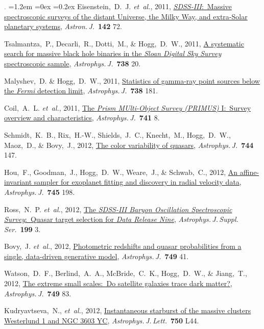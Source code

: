 \documentclass[10pt,letterpaper]{article}
\newcommand{\acronym}[1]{{\small{#1}}}
\newcommand{\foreign}[1]{\textsl{#1}}
\newcommand{\etal}{\foreign{et~al.}}
\newcommand{\project}[1]{\textsl{#1}}
\newcommand{\doi}[2]{\href{http://dx.doi.org/#1}{{#2}}}
\newcommand{\deemph}[1]{\textcolor{grey}{\footnotesize{#1}}}
\newcommand{\pubnumber}[1]{\deemph{{#1}.}}
\newcounter{refpubnum}
\newcommand{\hogglist}{%
    \rightmargin=0in
    \leftmargin=1.2em
    \topsep=0ex
    \partopsep=0pt
    \itemsep=0.2ex
    \parsep=0pt
    \itemindent=-1.0\leftmargin
    \listparindent=0.0\leftmargin
    \settowidth{\labelsep}{~}
    \usecounter{refpubnum}
  }
\begin{document}
\begin{list}{\pubnumber{\therefpubnum}}{\hogglist}
Eisenstein,~D.~J. \etal, 2011,
\doi{10.1088/0004-6256/142/3/72}{\project{\acronym{SDSS-III}}:\ Massive spectroscopic surveys of the distant Universe, the Milky Way, and extra-Solar planetary systems},
\textit{Astron.\,J.}\ \textbf{142} 72.
\item
Tsalmantza,~P., Decarli,~R., Dotti,~M., \& Hogg,~D.~W., 2011,
\doi{10.1088/0004-637X/738/1/20}{A systematic search for massive black hole binaries in the \project{Sloan Digital Sky Survey} spectroscopic sample},
\textit{Astrophys.\,J.}\ \textbf{738} 20.
\item
Malyshev,~D. \& Hogg,~D.~W., 2011,
\doi{10.1088/0004-637X/738/2/181}{Statistics of gamma-ray point sources below the \project{Fermi} detection limit},
\textit{Astrophys.\,J.}\ \textbf{738} 181.
\item
Coil,~A.~L. \etal, 2011,
\doi{10.1088/0004-637X/741/1/8}{The \project{Prism MUlti-Object Survey (\acronym{PRIMUS})} I:\ Survey overview and characteristics},
\textit{Astrophys.\,J.}\ \textbf{741} 8.
\item
Schmidt,~K.~B., Rix,~H.-W., Shields,~J.~C., Knecht,~M., Hogg,~D.~W., Maoz,~D., \& Bovy,~J., 2012,
\doi{10.1088/0004-637X/744/2/147}{The color variability of quasars}, 
\textit{Astrophys.\,J.}\ \textbf{744} 147.
\item
Hou,~F., Goodman,~J., Hogg,~D.~W., Weare,~J., \& Schwab,~C., 2012,
\doi{10.1088/0004-637X/745/2/198}{An affine-invariant sampler for exoplanet fitting and discovery in radial velocity data},
\textit{Astrophys.\,J.}\ \textbf{745} 198.
\item
Ross,~N.~P. \etal, 2012,
\doi{10.1088/0067-0049/199/1/3}{The \project{\acronym{SDSS-III} Baryon Oscillation Spectroscopic Survey}:\ Quasar target selection for \project{Data Release Nine}},
\textit{Astrophys.\,J.\,Suppl.\,Ser.}\ \textbf{199} 3.
\item
Bovy,~J. \etal, 2012,
\doi{10.1088/0004-637X/749/1/41}{Photometric redshifts and quasar probabilities from a single, data-driven generative model},
\textit{Astrophys.\,J.}\ \textbf{749} 41.
\item
Watson,~D.~F., Berlind,~A.~A., McBride,~C.~K., Hogg,~D.~W., \& Jiang,~T., 2012,
\doi{10.1088/0004-637X/749/1/83}{The extreme small scales:\ Do satellite galaxies trace dark matter?},
\textit{Astrophys.\,J.}\ \textbf{749} 83.
\item
Kudryavtseva,~N., \etal, 2012,
\doi{10.1088/2041-8205/750/2/L44}{Instantaneous starburst of the massive clusters Westerlund 1 and NGC 3603 YC},
\textit{Astrophys.\,J.\,Lett.}\ \textbf{750} L44.

\end{list}
\end{document}
